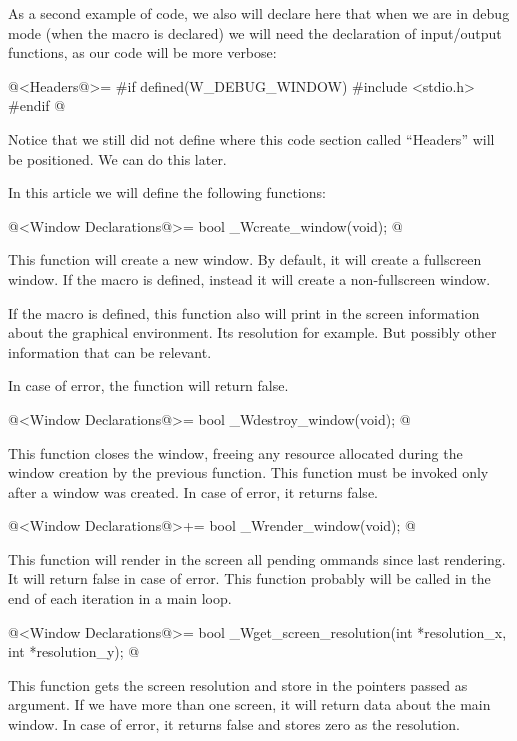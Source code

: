 As a second example of code, we also will declare here that when we
are in debug mode (when the macro  is
declared) we will need the declaration of input/output functions, as
our code will be more verbose:

\iniciocodigo
@<Headers@>=
#if defined(W_DEBUG_WINDOW)
#include <stdio.h>
#endif
@
\fimcodigo

Notice that we still did not define where this code section called
``Headers'' will be positioned. We can do this later.


In this article we will define the following functions:

\iniciocodigo
@<Window Declarations@>=
bool _Wcreate_window(void);
@
\fimcodigo

This function will create a new window. By default, it will create a
fullscreen window. If the macro 
is defined, instead it will create a non-fullscreen window.

If the macro  is defined, this function
also will print in the screen information about the graphical
environment. Its resolution for example. But possibly other
information that can be relevant.

In case of error, the function will return false.

\iniciocodigo
@<Window Declarations@>=
bool _Wdestroy_window(void);
@
\fimcodigo

This function closes the window, freeing any resource allocated during
the window creation by the previous function. This function must be
invoked only after a window was created. In case of error, it returns
false.

\iniciocodigo
@<Window Declarations@>+=
bool _Wrender_window(void);
@
\fimcodigo

This function will render in the screen all pending ommands since last
rendering. It will return false in case of error. This function
probably will be called in the end of each iteration in a main loop.

\iniciocodigo
@<Window Declarations@>=
bool _Wget_screen_resolution(int *resolution_x, int *resolution_y);
@
\fimcodigo

This function gets the screen resolution and store in the pointers
passed as argument. If we have more than one screen, it will return
data about the main window. In case of error, it returns false and
stores zero as the resolution.

